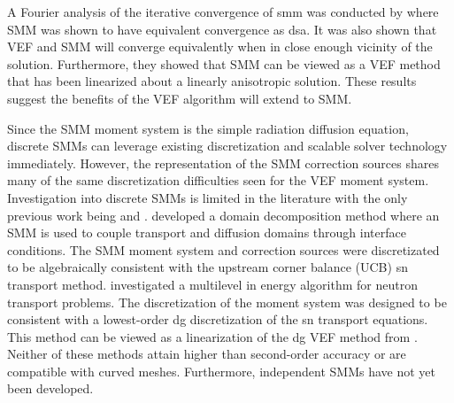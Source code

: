 \documentclass[../doc.tex]{subfiles}
\begin{document}
A Fourier analysis of the iterative convergence of \gls{smm} was conducted by \textcite{cefus} where SMM was shown to have equivalent convergence as \gls{dsa}. It was also shown that VEF and SMM will converge equivalently when in close enough vicinity of the solution. Furthermore, they showed that SMM can be viewed as a VEF method that has been linearized about a linearly anisotropic solution. These results suggest the benefits of the VEF algorithm will extend to SMM. 

Since the SMM moment system is the simple radiation diffusion equation, discrete SMMs can leverage existing discretization and scalable solver technology immediately. However, the representation of the SMM correction sources shares many of the same discretization difficulties seen for the VEF moment system. Investigation into discrete SMMs is limited in the literature with the only previous work being \textcite{STEHLE2014325} and \textcite{https://doi.org/10.48550/arxiv.2102.09054}. \textcite{STEHLE2014325} developed a domain decomposition method where an SMM is used to couple transport and diffusion domains through interface conditions. The SMM moment system and correction sources were discretizated to be algebraically consistent with the upstream corner balance (UCB) \cite{ucb_maginot} \gls{sn} transport method. 
\textcite{https://doi.org/10.48550/arxiv.2102.09054} investigated a multilevel in energy algorithm for neutron transport problems. The discretization of the moment system was designed to be consistent with a lowest-order \gls{dg} discretization of the \gls{sn} transport equations. This method can be viewed as a linearization of the \gls{dg} VEF method from \cite{dima_dfem}. 
Neither of these methods attain higher than second-order accuracy or are compatible with curved meshes. Furthermore, independent SMMs have not yet been developed. 
\end{document}
